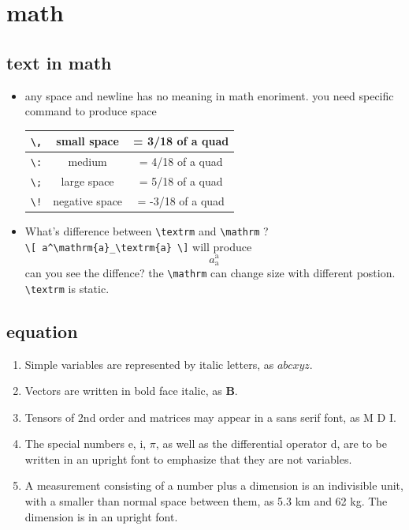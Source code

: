 \documentclass[a4paper,12pt,twoside]{book}
\begin{document}
\section{math}
		\subsection{text in math}
			\begin{itemize}
			\item any space and newline has no meaning in math enoriment. you need specific command to produce space \\
				\begin{tabular}{|c|c|c|}
				\hline \verb=\,= & small space & = 3/18 of a quad \\
				\hline \verb=\:= & medium  & = 4/18 of a quad \\
				\hline \verb=\;= & large space  & = 5/18 of a quad\\
				\hline \verb=\!= & negative space  & = -3/18 of a quad\\
				\hline
				\end{tabular}
			\item What's difference between \verb=\textrm= and \verb=\mathrm= ? \\
			\verb=\[ a^\mathrm{a}_\textrm{a} \]=  will produce \[ a^\mathrm{a}_\textrm{a} \]
			can you see the diffence? the \verb=\mathrm= can change size with different postion. \verb=\textrm= is static.
			\end{itemize}
		
		\subsection{equation}
		\begin{enumerate}
		\item Simple variables are represented by italic letters, as $a b c x y z$.
		\item Vectors are written in bold face italic, as $\boldsymbol{B}$.
		\item Tensors of 2nd order and matrices may appear in a sans serif font, as
		M D I.
		\item The special numbers e, i, $\pi$, as well as the differential operator d, are to be
		written in an upright font to emphasize that they are not variables.
		\item A measurement consisting of a number plus a dimension is an indivisible
		unit, with a smaller than normal space between them, as 5.3 km and 62 kg.
		The dimension is in an upright font.
		\end{enumerate} \par
\end{document}
